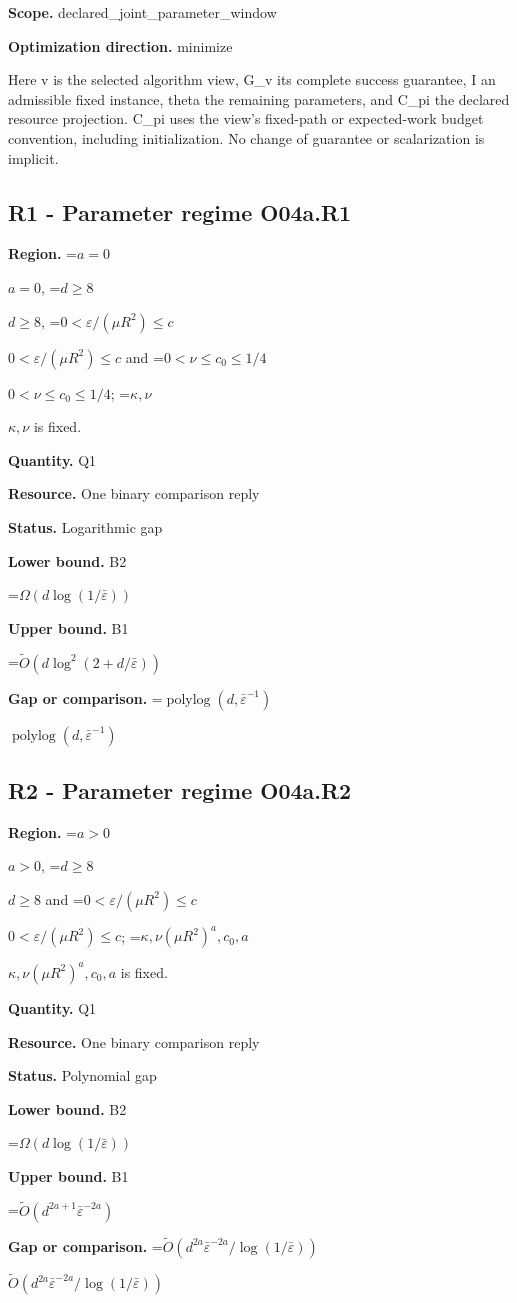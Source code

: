 \documentclass[10pt,a4paper]{article}
\newcommand{\AtlasMath}[1]{\par\begingroup\centering\setbox0=\hbox{$\displaystyle #1$}\ifdim\wd0>1.4\linewidth\typeout{ATLAS WIDE FORMULA: \the\wd0}\fi\ifdim\wd0>\linewidth\resizebox{\linewidth}{!}{\box0}\else\box0\fi\par\endgroup}
\newcommand{\AtlasInlineMath}[1]{\begingroup\setbox0=\hbox{$#1$}\ifdim\wd0>.4\linewidth\endgroup\AtlasMath{#1}\else\endgroup$#1$\fi}
\begin{document}
\textbf{Scope.} declared\_joint\_parameter\_window

\textbf{Optimization direction.} minimize

Here v is the selected algorithm view, G\_v its complete success guarantee, I an admissible fixed instance, theta the remaining parameters, and C\_pi the declared resource projection. C\_pi uses the view's fixed-path or expected-work budget convention, including initialization. No change of guarantee or scalarization is implicit.

\subsection{R1 - Parameter regime O04a.R1}
\textbf{Region.} \AtlasInlineMath{a=0}, \AtlasInlineMath{d\ge8}, \AtlasInlineMath{0<\varepsilon/(\mu R^2)\le c} and \AtlasInlineMath{0<\nu\le c_0\le1/4}; \AtlasInlineMath{\kappa,\nu} is fixed.

\textbf{Quantity.} Q1

\textbf{Resource.} One binary comparison reply

\textbf{Status.} Logarithmic gap

\textbf{Lower bound.} B2

\AtlasMath{\Omega(d\log(1/\bar\varepsilon))}
\textbf{Upper bound.} B1

\AtlasMath{\widetilde{O}(d\log^2(2+d/\bar\varepsilon))}
\textbf{Gap or comparison.} \AtlasInlineMath{\operatorname{polylog}(d,\bar\varepsilon^{-1})}

\subsection{R2 - Parameter regime O04a.R2}
\textbf{Region.} \AtlasInlineMath{a>0}, \AtlasInlineMath{d\ge8} and \AtlasInlineMath{0<\varepsilon/(\mu R^2)\le c}; \AtlasInlineMath{\kappa,\nu(\mu R^2)^a,c_0,a} is fixed.

\textbf{Quantity.} Q1

\textbf{Resource.} One binary comparison reply

\textbf{Status.} Polynomial gap

\textbf{Lower bound.} B2

\AtlasMath{\Omega(d\log(1/\bar\varepsilon))}
\textbf{Upper bound.} B1

\AtlasMath{\widetilde{O}(d^{2a+1}\bar\varepsilon^{-2a})}
\textbf{Gap or comparison.} \AtlasInlineMath{\widetilde{O}(d^{2a}\bar\varepsilon^{-2a}/\log(1/\bar\varepsilon))}
\end{document}
